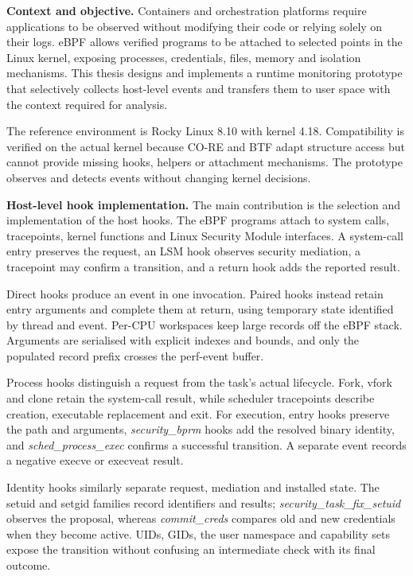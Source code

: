 \noindent\textbf{Context and objective.}
Containers and orchestration platforms require applications to be observed
without modifying their code or relying solely on their logs. eBPF allows
verified programs to be attached to selected points in the Linux kernel,
exposing processes, credentials, files, memory and isolation mechanisms. This
thesis designs and implements a runtime monitoring prototype that selectively
collects host-level events and transfers them to user space with the context
required for analysis.

The reference environment is Rocky Linux 8.10 with kernel 4.18. Compatibility
is verified on the actual kernel because CO-RE and BTF adapt structure access
but cannot provide missing hooks, helpers or attachment mechanisms. The
prototype observes and detects events without changing kernel decisions.

\medskip
\noindent\textbf{Host-level hook implementation.}
The main contribution is the selection and implementation of the host hooks.
The eBPF programs attach to system calls, tracepoints, kernel functions and
Linux Security Module interfaces. A system-call entry preserves the request,
an LSM hook observes security mediation, a tracepoint may confirm a transition,
and a return hook adds the reported result.

Direct hooks produce an event in one invocation. Paired hooks instead retain
entry arguments and complete them at return, using temporary state identified
by thread and event. Per-CPU workspaces keep large records off the eBPF stack.
Arguments are serialised with explicit indexes and bounds, and only the
populated record prefix crosses the perf-event buffer.

Process hooks distinguish a request from the task's actual lifecycle. Fork,
vfork and clone retain the system-call result, while scheduler tracepoints
describe creation, executable replacement and exit. For execution, entry hooks
preserve the path and arguments, \emph{security\_bprm} hooks add the resolved
binary identity, and \emph{sched\_process\_exec} confirms a successful
transition. A separate event records a negative execve or execveat result.

Identity hooks similarly separate request, mediation and installed state. The
setuid and setgid families record identifiers and results;
\emph{security\_task\_fix\_setuid} observes the proposal, whereas
\emph{commit\_creds} compares old and new credentials when they become active.
UIDs, GIDs, the user namespace and capability sets expose the transition
without confusing an intermediate check with its final outcome.

